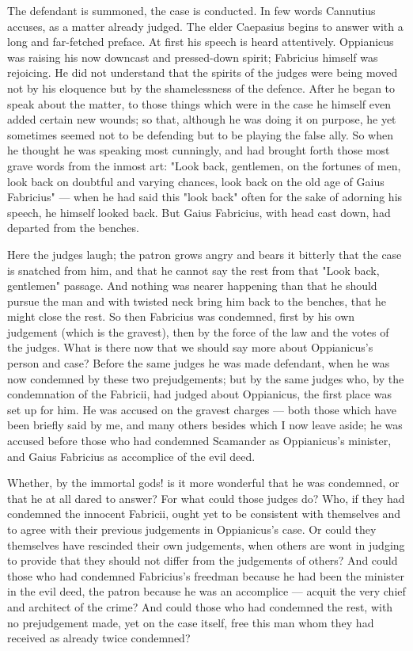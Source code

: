  The defendant is summoned, the case is conducted. In few words Cannutius accuses, as a matter already judged. The elder Caepasius begins to answer with a long and far-fetched preface. At first his speech is heard attentively. Oppianicus was raising his now downcast and pressed-down spirit; Fabricius himself was rejoicing. He did not understand that the spirits of the judges were being moved not by his eloquence but by the shamelessness of the defence. After he began to speak about the matter, to those things which were in the case he himself even added certain new wounds; so that, although he was doing it on purpose, he yet sometimes seemed not to be defending but to be playing the false ally. So when he thought he was speaking most cunningly, and had brought forth those most grave words from the inmost art: "Look back, gentlemen, on the fortunes of men, look back on doubtful and varying chances, look back on the old age of Gaius Fabricius" --- when he had said this "look back" often for the sake of adorning his speech, he himself looked back. But Gaius Fabricius, with head cast down, had departed from the benches.

 Here the judges laugh; the patron grows angry and bears it bitterly that the case is snatched from him, and that he cannot say the rest from that "Look back, gentlemen" passage. And nothing was nearer happening than that he should pursue the man and with twisted neck bring him back to the benches, that he might close the rest. So then Fabricius was condemned, first by his own judgement (which is the gravest), then by the force of the law and the votes of the judges. What is there now that we should say more about Oppianicus's person and case? Before the same judges he was made defendant, when he was now condemned by these two prejudgements; but by the same judges who, by the condemnation of the Fabricii, had judged about Oppianicus, the first place was set up for him. He was accused on the gravest charges --- both those which have been briefly said by me, and many others besides which I now leave aside; he was accused before those who had condemned Scamander as Oppianicus's minister, and Gaius Fabricius as accomplice of the evil deed.

 Whether, by the immortal gods! is it more wonderful that he was condemned, or that he at all dared to answer? For what could those judges do? Who, if they had condemned the innocent Fabricii, ought yet to be consistent with themselves and to agree with their previous judgements in Oppianicus's case. Or could they themselves have rescinded their own judgements, when others are wont in judging to provide that they should not differ from the judgements of others? And could those who had condemned Fabricius's freedman because he had been the minister in the evil deed, the patron because he was an accomplice --- acquit the very chief and architect of the crime? And could those who had condemned the rest, with no prejudgement made, yet on the case itself, free this man whom they had received as already twice condemned?

